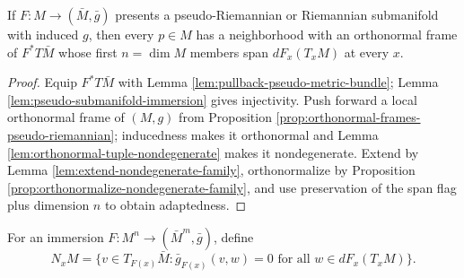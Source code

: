 \begin{proposition}
\label{prop:pseudo-riemannian-adapted-frame}
\leanok
{}
If $F:M\to(\bar M,\bar g)$ presents a pseudo-Riemannian or Riemannian submanifold with induced $g$, then every $p\in M$ has a neighborhood with an orthonormal frame of $F^*T\bar M$ whose first $n=\dim M$ members span $dF_x(T_xM)$ at every $x$.
\end{proposition}
\begin{proof}
\leanok
{}
\sketch Equip $F^*T\bar M$ with Lemma \ref{lem:pullback-pseudo-metric-bundle}; Lemma \ref{lem:pseudo-submanifold-immersion} gives injectivity. Push forward a local orthonormal frame of $(M,g)$ from Proposition \ref{prop:orthonormal-frames-pseudo-riemannian}; inducedness makes it orthonormal and Lemma \ref{lem:orthonormal-tuple-nondegenerate} makes it nondegenerate. Extend by Lemma \ref{lem:extend-nondegenerate-family}, orthonormalize by Proposition \ref{prop:orthonormalize-nondegenerate-family}, and use preservation of the span flag plus dimension $n$ to obtain adaptedness.
\end{proof}

\begin{definition}
\label{def:pseudo-normal-space}
\leanok
{}
For an immersion $F:M^n\to(\bar M^m,\bar g)$, define
\[
N_xM=\{v\in T_{F(x)}\bar M:\bar g_{F(x)}(v,w)=0\text{ for all }w\in dF_x(T_xM)\}.
\]
\end{definition}

